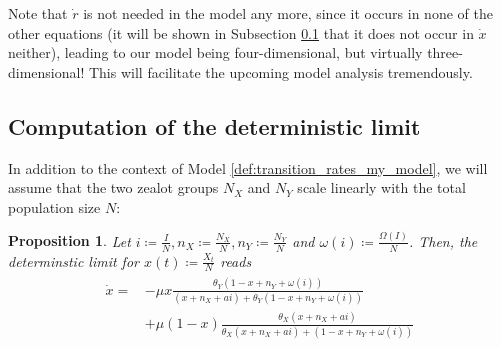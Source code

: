 \documentclass[12pt,a4paper,twoside]{article}
\newtheorem{prop}{Proposition}[section]
\begin{document}
Note that $\dot{r}$ is not needed in the model any more, since it occurs in none of the other equations (it will be shown in Subsection \ref{subsec:det_lim_comp} that it does not occur in $\dot{x}$ neither), leading to our model being four-dimensional, but virtually three-dimensional! This will facilitate the upcoming model analysis tremendously. 

\subsection{Computation of the deterministic limit}\label{subsec:det_lim_comp}
In addition to the context of Model \ref{def:transition_rates_my_model}, we will assume that the two zealot groups $N_X$ and $N_Y$ scale linearly with the total population size $N$:
\begin{prop}
	Let $i \coloneqq \frac{I}{N}, n_X \coloneqq \frac{N_X}{N}, n_Y \coloneqq \frac{N_Y}{N}$ and $\omega\left(i\right)\coloneqq \frac{\Omega\left(I\right)}{N}$. Then, the determinstic limit for $x\left(t\right) \coloneqq \frac{X_t}{N}$ reads
	\begin{align}\label{prop:det_limit_my_model}
	\begin{split}
	\dot{x} = &-\mu x\frac{\theta_Y(1-x+n_Y+\omega\left(i\right))}{(x+n_X+ai) + \theta_Y(1-x+n_Y+\omega\left(i\right))}\\
	\qquad&+ \mu \left(1-x\right)\frac{\theta_X (x+ n_X+ ai)}{\theta_X (x + n_X + ai) + (1-x + n_Y + \omega\left(i\right))}
	\end{split}
	\end{align}
\end{prop}
\end{document}
